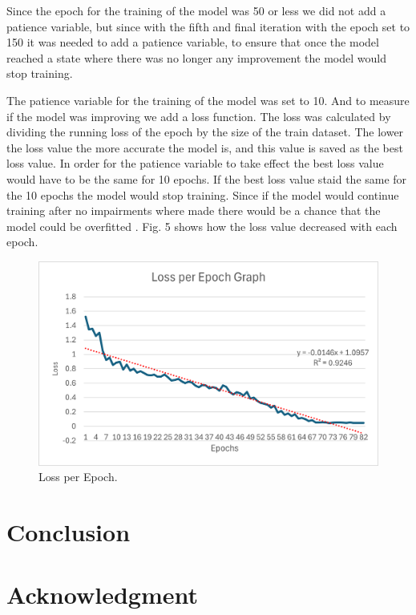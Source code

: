\documentclass[conference]{IEEEtran}
\begin{document}
Since the epoch for the training of the model was 50 or less we did not add a patience variable, but since with the fifth and final iteration with the epoch set to 150 it was needed to add a patience variable, to ensure that once the model reached a state where there was no longer any improvement the model would stop training.

The patience variable for the training of the model was set to 10. And to measure if the model was improving we add a loss function. The loss was calculated by dividing the running loss of the epoch by the size of the train dataset. The lower the loss value the more accurate the model is, and this value is saved as the best loss value. In order for the patience variable to take effect the best loss value would have to be the same for 10 epochs. If the best loss value staid the same for the 10 epochs the model would stop training. Since if the model would continue training after no impairments where made there would be a chance that the model could be overfitted \cite{b5}. Fig. 5 shows how the loss value decreased with each epoch.

\begin{figure}[h]
    \centering
    \includegraphics[width=\linewidth]{Loss_per_Epoch_Graph.png}
    \caption{Loss per Epoch.}
    \label{fig 3}
\end{figure}

\section{Conclusion}

\section*{Acknowledgment}
\end{document}
